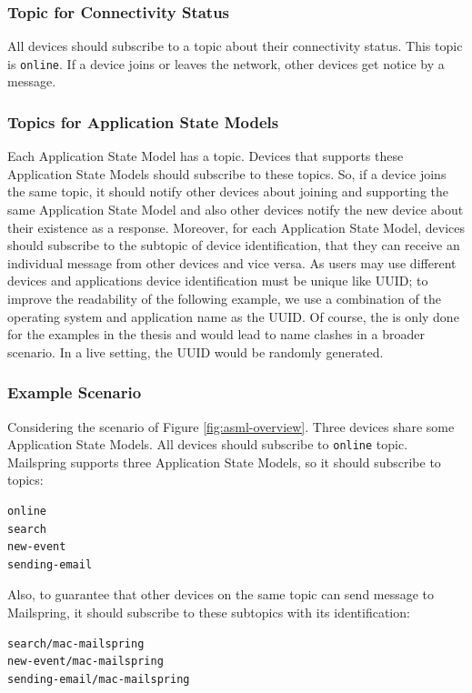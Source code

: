 \subsubsection{Topic for Connectivity Status}
All devices should subscribe to a topic about their connectivity status. This topic is \lstinline[basicstyle=\ttfamily]{online}. If a device joins or leaves the network, other devices get notice by a message.

\subsubsection{Topics for Application State Models}
Each Application State Model has a topic. Devices that supports these Application State Models should subscribe to these topics. So, if a device joins the same topic, it should notify other devices about joining and supporting the same Application State Model and also other devices notify the new device about their existence as a response. Moreover, for each Application State Model, devices should subscribe to the subtopic of device identification, that they can receive an individual message from other devices and vice versa. As users may use different devices and applications device identification must be unique like UUID; to improve the readability of the following example, we use a combination of the operating system and application name as the UUID. Of course, the is only done for the examples in the thesis and would lead to name clashes in a broader scenario. In a live setting, the UUID would be randomly generated.



\subsubsection{Example Scenario}
Considering the scenario of Figure \ref{fig:asml-overview}. Three devices share some Application State Models. All devices should subscribe to \lstinline[basicstyle=\ttfamily]{online} topic. Mailspring supports three Application State Models, so it should subscribe to topics:
\begin{verbatim}
online
search
new-event
sending-email
\end{verbatim}

Also, to guarantee that other devices on the same topic can send message to Mailspring, it should subscribe to these subtopics with its identification: 
\begin{verbatim}
search/mac-mailspring
new-event/mac-mailspring
sending-email/mac-mailspring
\end{verbatim}

